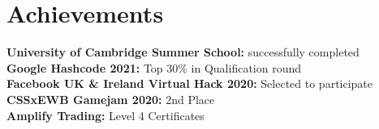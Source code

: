 \documentclass[a4paper,11pt]{article}
\begin{document}
\section{Achievements}
  \textbf{University of Cambridge Summer School:}{ successfully completed} \\
  \textbf{Google Hashcode 2021:} {Top 30\% in Qualification round} \\
  \textbf{Facebook UK \& Ireland Virtual Hack 2020:} {Selected to participate} \\
  \textbf{CSSxEWB Gamejam 2020:} {2nd Place} \\
  \textbf{Amplify Trading:} {Level 4 Certificates} \\
  
\bigskip
\end{document}
